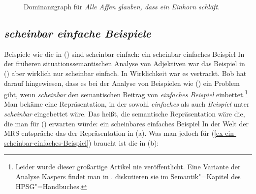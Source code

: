 \begin{figure}
\caption{Dominanzgraph für \emph{Alle Affen glauben, dass ein Einhorn schläft.}}\label{fig-alle-Affen-glauben-dass-ein-Einhorn-schläft}

\end{figure}

\subsection{\emph{scheinbar einfache Beispiele}}
\label{sec-scheinbar-einfaches-Beispiel}

Beispiele wie die in () sind scheinbar einfach:
\ea
\label{ex-ein-scheinbar-einfaches-Beispiel}
ein scheinbar einfaches Beispiel
\z
In der früheren situationssemantischen Analyse von Adjektiven war das Beispiel in () aber
wirklich nur scheinbar einfach. In Wirklichkeit war es vertrackt. Bob \citet{Kasper97a} hat darauf hingewiesen,
dass es bei der Analyse von Beispielen wie () ein Problem gibt, wenn \emph{scheinbar} den
semantischen Beitrag von \emph{einfaches Beispiel} einbettet.\footnote{%
 Leider wurde dieser großartige Artikel nie veröffentlicht. Eine Variante der Analyse Kaspers
 findet man in . \citet[Section~3.2]{KR2024a} diskutieren sie im Semantik"=Kapitel des HPSG"=Handbuches.
} Man bekäme eine Repräsentation, in der sowohl \emph{einfaches} als auch \emph{Beispiel} unter
\emph{scheinbar} eingebettet wäre. Das heißt, die semantische Repräsentation wäre die, die man für
() erwarten würde:
\ea
ein scheinbares einfaches Beispiel
\z
In der Welt der MRS entspräche das der Repräsentation in (a). Was man jedoch für (\ref{ex-ein-scheinbar-einfaches-Beispiel}) braucht ist die in (b):

\eal
\ex {}
\ex
\label{mrs-ein-scheinbar-einfaches-Beispiel} 
\zl

